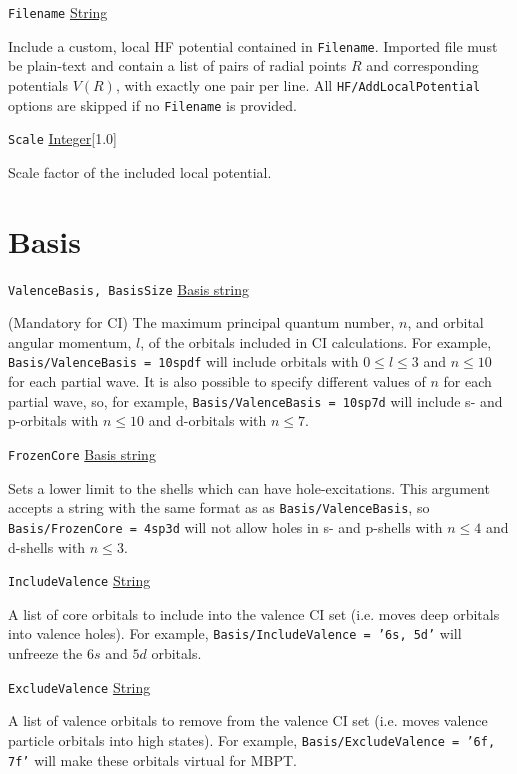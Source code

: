 \documentclass{report}
\begin{document}
\texttt{Filename} \uline{String}
\begin{adjustwidth}{1cm}{}
Include a custom, local HF potential contained in \texttt{Filename}. Imported file must be plain-text
and contain a list of pairs of radial points $R$ and corresponding potentials $V(R)$, with exactly one
pair per line. All \texttt{HF/AddLocalPotential} options are skipped if no \texttt{Filename} is provided.
\end{adjustwidth}

\texttt{Scale} \uline{Integer}[1.0]
\begin{adjustwidth}{1cm}{}
Scale factor of the included local potential.
\end{adjustwidth}

\section{Basis}

\texttt{ValenceBasis, BasisSize} \uline{Basis string}
\begin{adjustwidth}{1cm}{}
(Mandatory for CI) The maximum principal quantum number, $n$, and orbital angular momentum, $l$, of
the orbitals included in CI calculations. For example, 
\texttt{Basis/ValenceBasis = 10spdf} will include orbitals with $0 \leq l \leq 3$ and $n \leq 10$ for
each partial wave. It is also possible to specify different values of $n$ for each partial wave, so, for
example, \texttt{Basis/ValenceBasis = 10sp7d} will include s- and p-orbitals with $n \leq 10$ and
d-orbitals with $n \leq 7$.
\end{adjustwidth}

\texttt{FrozenCore} \uline{Basis string}
\begin{adjustwidth}{1cm}{}
Sets a lower limit to the shells which can have hole-excitations. This argument accepts a string with
the same format as as \texttt{Basis/ValenceBasis}, so \texttt{Basis/FrozenCore = 4sp3d} will not allow 
holes in s- and p-shells with $n \leq 4$ and d-shells with $n \leq 3$.
\end{adjustwidth}

\texttt{IncludeValence} \uline{String}
\begin{adjustwidth}{1cm}{}
A list of core orbitals to include into the valence CI set (i.e. moves deep orbitals into valence holes). For example, \texttt{Basis/IncludeValence = '6s, 5d'} will unfreeze the $6s$ and $5d$ orbitals.
\end{adjustwidth}

\texttt{ExcludeValence} \uline{String}
\begin{adjustwidth}{1cm}{}
A list of valence orbitals to remove from the valence CI set (i.e. moves valence particle orbitals into high states). For example, \texttt{Basis/ExcludeValence = '6f, 7f'} will make these orbitals virtual for MBPT.
\end{adjustwidth}
\end{document}
